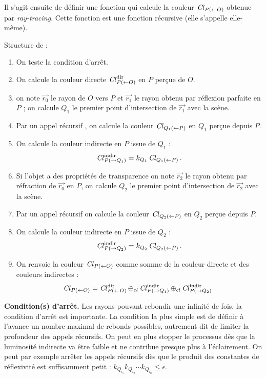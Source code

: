 \documentclass[11pt,class=report,crop=false]{standalone}
\begin{document}
Il s'agit ensuite de définir une fonction  qui calcule la couleur $\operatorname{\it Cl}_{P(\leftarrow O)}$ obtenue par \emph{ray-tracing}. Cette fonction est une fonction récursive (elle s'appelle elle-même).


\medskip

Structure de  :
\begin{enumerate}
	\item On teste la condition d'arrêt.
	\item On calcule la couleur directe $\operatorname{\it Cl}^\text{dir}_{P(\leftarrow O)}$ en $P$ perçue de $O$.
	\item on note $\vec{r_0}$ le rayon de $O$ vers $P$ et $\vec{r_1}$ le rayon obtenu par réflexion parfaite en $P$ ; on calcule $Q_1$ le premier point d'intersection de $\vec{r_1}$ avec la scène.
	\item Par un appel récursif , on calcule la couleur $\operatorname{\it Cl}_{Q_1(\leftarrow P)}$ en $Q_1$ perçue depuis $P$.
	\item On calcule la couleur indirecte en $P$ issue de $Q_1$ :
	$$\operatorname{\it Cl}^{\text{indir}}_{P(\rightarrow Q_1)} = k_{Q_1} \operatorname{\it Cl}_{Q_1(\leftarrow P)}.$$
    \item Si l'objet a des propriétés de transparence on note $\vec{r_2}$ le rayon obtenu par réfraction de $\vec{r_0}$ en $P$, on calcule $Q_2$ le premier point d'intersection de $\vec{r_2}$ avec la scène.
    \item Par un appel récursif  on calcule la couleur $\operatorname{\it Cl}_{Q_2(\leftarrow P)}$ en $Q_2$ perçue depuis $P$.
   \item On calcule la couleur indirecte en $P$ issue de $Q_2$ :
   $$\operatorname{\it Cl}^{\text{indir}}_{P(\rightarrow Q_2)} = k_{Q_2} \operatorname{\it Cl}_{Q_2(\leftarrow P)}.$$	
   \item On renvoie la couleur $\operatorname{\it Cl}_{P(\leftarrow O)}$ comme somme de la couleur directe et des couleurs indirectes :
   $$\operatorname{\it Cl}_{P(\leftarrow O)} = \operatorname{\it Cl}^{\text{dir}}_{P(\leftarrow O)} 
   \oplus_{cl} \operatorname{\it Cl}^{\text{indir}}_{P(\rightarrow Q_1)}
   \oplus_{cl} \operatorname{\it Cl}^{\text{indir}}_{P(\rightarrow Q_2)}.$$	
\end{enumerate}


	
\textbf{Condition(s) d'arrêt.}
Les rayons pouvant rebondir une infinité de fois, la condition d'arrêt est importante. La condition la plus simple est de définir à l'avance un nombre maximal de rebonds possibles, autrement dit de limiter la profondeur des appels récursifs.
On peut en plus stopper le processus dès que la luminosité indirecte va être faible et ne contribue presque plus à l'éclairement. On peut par exemple arrêter les appels récursifs dès que le produit des constantes de réflexivité est suffisamment petit : $k_{Q_{i_1}} k_{Q_{i_2}} \cdots k_{Q_{i_n}} \le \epsilon$.
\end{document}
